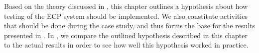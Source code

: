 Based on the theory discussed in , this chapter
outlines a hypothesis about how testing of the ECP system should be
implemented. We also constitute activities that should be done during
the case study, and thus forms the base for the results presented in
. In , we compare the outlined
hypothesis described in this chapter to the actual results in order to
see how well this hypothesis worked in practice.
